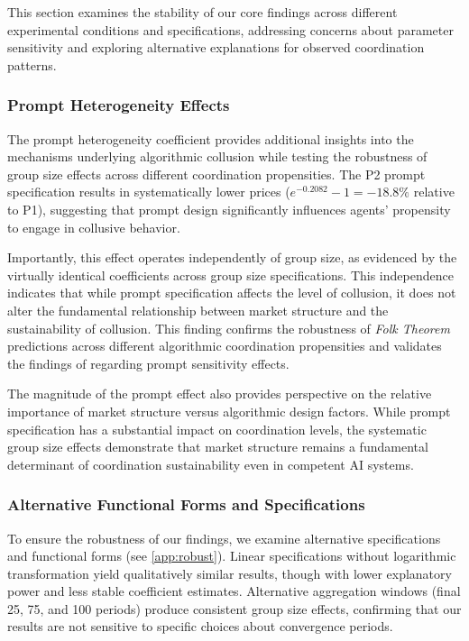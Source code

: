 This section examines the stability of our core findings across different experimental conditions and specifications, addressing concerns about parameter sensitivity and exploring alternative explanations for observed coordination patterns.

\subsubsection*{Prompt Heterogeneity Effects}

The prompt heterogeneity coefficient provides additional insights into the mechanisms underlying algorithmic collusion while testing the robustness of group size effects across different coordination propensities. The P2 prompt specification results in systematically lower prices ($e^{-0.2082} - 1 = -18.8\%$ relative to P1), suggesting that prompt design significantly influences agents' propensity to engage in collusive behavior.

Importantly, this effect operates independently of group size, as evidenced by the virtually identical coefficients across group size specifications. This independence indicates that while prompt specification affects the level of collusion, it does not alter the fundamental relationship between market structure and the sustainability of collusion. This finding confirms the robustness of \emph{Folk Theorem} predictions across different algorithmic coordination propensities and validates the findings of \textcite{fish_algorithmic_2025} regarding prompt sensitivity effects.

The magnitude of the prompt effect also provides perspective on the relative importance of market structure versus algorithmic design factors. While prompt specification has a substantial impact on coordination levels, the systematic group size effects demonstrate that market structure remains a fundamental determinant of coordination sustainability even in competent AI systems.

\subsubsection*{Alternative Functional Forms and Specifications}

To ensure the robustness of our findings, we examine alternative specifications and functional forms (see \ref{app:robust}). Linear specifications without logarithmic transformation yield qualitatively similar results, though with lower explanatory power and less stable coefficient estimates. Alternative aggregation windows (final 25, 75, and 100 periods) produce consistent group size effects, confirming that our results are not sensitive to specific choices about convergence periods.

